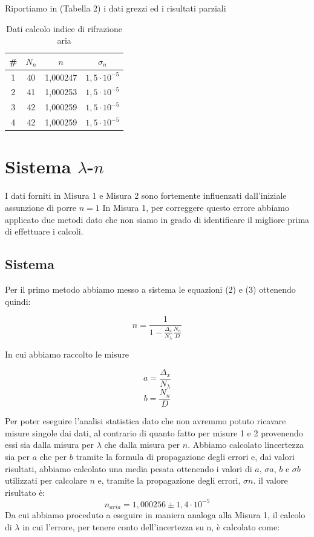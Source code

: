 \documentclass{article}
\begin{document}
Riportiamo in (Tabella 2) i dati grezzi ed i risultati parziali


\begin{table}[h!]
\centering
\begin{tabular}{ | c | c | c | c | }
\hline
 \# & $N_n$ & $n$ & $\sigma_n$\\
\hline
   1 & 40 & 1,000247 & $1,5 \cdot 10^{-5}$\\
   2 & 41 & 1,000253 & $1,5 \cdot 10^{-5}$\\
   3 & 42 & 1,000259 & $1,5 \cdot 10^{-5}$\\
   4 & 42 & 1,000259 & $1,5 \cdot 10^{-5}$\\
\hline
\end{tabular}
\caption{Dati calcolo indice di rifrazione aria}
\label{table:2}
\end{table}




\section{Sistema $\lambda$-$n$}
I dati forniti in Misura 1 e Misura 2 sono fortemente influenzati dall'iniziale assunzione di porre $n = 1$ In Misura 1, per correggere questo errore abbiamo applicato due metodi dato che non siamo in grado di identificare il migliore prima di effettuare i calcoli. 



\subsection{Sistema}
Per il primo metodo abbiamo messo a sistema le equazioni (2) e (3) ottenendo quindi:

\begin{equation} 
n= \frac{1}{1 - \frac{\Delta_x}{N_\lambda} \frac{N_n}{D}} 
\end{equation}

In cui abbiamo raccolto le misure

\[ a = \frac{\Delta_x}{N_\lambda} \]
\[ b = \frac{N_n}{D} \]

Per poter eseguire l'analisi statistica dato che non avremmo potuto ricavare misure singole dai dati, al contrario di quanto fatto per misure 1 e 2 provenendo essi sia dalla misura per $\lambda$ che dalla misura per $n$. Abbiamo calcolato lincertezza sia per $a$ che per $b$ tramite la formula di propagazione degli errori e, dai valori risultati, abbiamo calcolato una media pesata ottenendo i valori di $a$, $\sigma a$, $b$ e $\sigma b$ utilizzati per calcolare $n$ e, tramite la propagazione degli errori, $\sigma n$. il valore risultato è:
\[ n_{aria} = 1,000256 \pm 1,4 \cdot 10^{-5} \]
Da cui abbiamo proceduto a eseguire in maniera analoga alla Misura 1, il calcolo di $\lambda$ in cui l'errore, per tenere conto dell'incertezza su n, è calcolato come:
\end{document}
